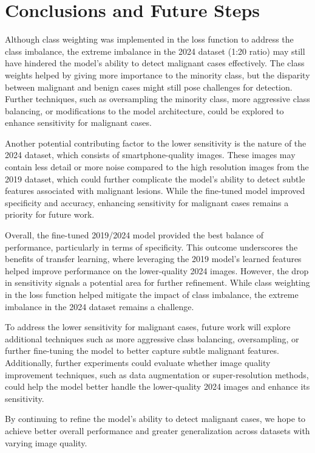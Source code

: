 \documentclass{article}
\begin{document}
\section{Conclusions and Future Steps}

Although class weighting was implemented in the loss function to address the class imbalance, the extreme
imbalance in the 2024 dataset (1:20 ratio) may still have hindered the model’s ability to detect malignant cases
effectively. The class weights helped by giving more importance to the minority class, but the disparity between
malignant and benign cases might still pose challenges for detection. Further techniques, such as oversampling the
minority class, more aggressive class balancing, or modifications to the model architecture, could be explored to
enhance sensitivity for malignant cases.

Another potential contributing factor to the lower sensitivity is the nature of the 2024 dataset, which consists of
smartphone-quality images. These images may contain less detail or more noise compared to the high resolution
images from the 2019 dataset, which could further complicate the model’s ability to detect subtle features associated
with malignant lesions. While the fine-tuned model improved specificity and accuracy, enhancing sensitivity for
malignant cases remains a priority for future work.

Overall, the fine-tuned 2019/2024 model provided the best balance of performance, particularly in terms of
specificity. This outcome underscores the benefits of transfer learning, where leveraging the 2019 model’s learned
features helped improve performance on the lower-quality 2024 images. However, the drop in sensitivity signals a
potential area for further refinement. While class weighting in the loss function helped mitigate the impact of class
imbalance, the extreme imbalance in the 2024 dataset remains a challenge.

To address the lower sensitivity for malignant cases, future work will explore additional techniques such as more
aggressive class balancing, oversampling, or further fine-tuning the model to better capture subtle malignant
features. Additionally, further experiments could evaluate whether image quality improvement techniques, such as
data augmentation or super-resolution methods, could help the model better handle the lower-quality 2024 images
and enhance its sensitivity.

By continuing to refine the model’s ability to detect malignant cases, we hope to achieve better overall performance
and greater generalization across datasets with varying image quality.
\end{document}
